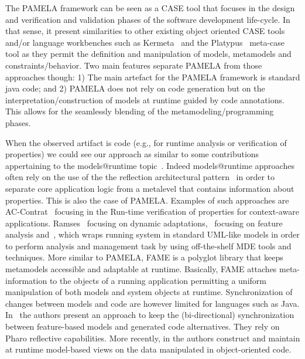 The PAMELA framework can be seen as a CASE tool that focuses in the design and verification and validation phases of the software development life-cycle. In that sense, it present similarities to other existing object oriented CASE tools and/or language workbenches such as Kermeta~\cite{kermeta} and the Platypus~\cite{platypus} meta-case tool as they permit the definition and manipulation of models, metamodels and constraints/behavior. Two main features separate PAMELA from those approaches though: 1) The main artefact for the PAMELA framework is standard java code; and 2) PAMELA does not rely on code generation but on the interpretation/construction of models at runtime guided by code annotations. This allows for the seamlessly blending of the metamodeling/programming phases.

When the observed artifact is code (e.g., for runtime analysis or verification of properties) we could see our approach as similar to some contributions appertaining to the models@runtime topic~\cite{bencomo2019models}. Indeed models@runtime approaches often rely  on the use of the the reflection architectural pattern~\cite{buschmann2008pattern} in order to separate core application logic from a metalevel that contains information about properties. This is also the case of PAMELA. 
Examples of such approaches are AC-Contrat~\cite{accontract} focusing in the Run-time verification of properties for context-aware applications. Ramses~\cite{ramses} focusing on dynamic adaptations,~\cite{denker2010modeling} focusing on feature analysis and~\cite{song2010applying}, which wraps running system in standard UML-like models in order to perform analysis and management task by using off-the-shelf MDE tools and techniques. More similar to PAMELA, FAME \cite{kuhn2008fame} is a polyglot library that keeps metamodels accessible and adaptable at runtime. Basically, FAME attaches meta-information to the objects of a running application permitting a uniform manipulation of both models and system objects at runtime. Synchronization of changes between models and code are however limited for languages such as Java. In~\cite{cavarle2016dynamic} the authors present an approach to keep the (bi-directional) synchronization between feature-based models and generated code alternatives. They rely on Pharo\cite{pharo} reflective capabilities. 
More recently, in \cite{boronat2019} the authors construct and maintain at runtime model-based views on the data manipulated in object-oriented code.

